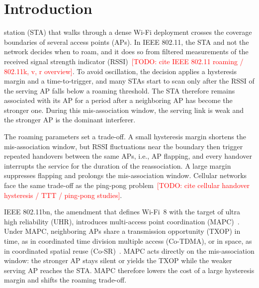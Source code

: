 \documentclass{ieeeaccess}
\newcommand{\todo}[1]{\textcolor{red}{[TODO: #1]}}
\begin{document}
\maketitle

\section{Introduction}
\label{sec:introduction}
 station (STA) that walks through a dense Wi-Fi deployment crosses the coverage boundaries of several access points (APs). In IEEE 802.11, the STA and not the network decides when to roam, and it does so from filtered measurements of the received signal strength indicator (RSSI)~\todo{cite IEEE 802.11 roaming / 802.11k, v, r overview}. To avoid oscillation, the decision applies a hysteresis margin and a time-to-trigger, and many STAs start to scan only after the RSSI of the serving AP falls below a roaming threshold. The STA therefore remains associated with its AP for a period after a neighboring AP has become the stronger one. During this mis-association window, the serving link is weak and the stronger AP is the dominant interferer.

The roaming parameters set a trade-off. A small hysteresis margin shortens the mis-association window, but RSSI fluctuations near the boundary then trigger repeated handovers between the same APs, i.e., AP flapping, and every handover interrupts the service for the duration of the reassociation. A large margin suppresses flapping and prolongs the mis-association window. Cellular networks face the same trade-off as the ping-pong problem~\todo{cite cellular handover hysteresis / TTT / ping-pong studies}.

IEEE 802.11bn, the amendment that defines Wi-Fi~8 with the target of ultra high reliability (UHR), introduces multi-access point coordination (MAPC)~\cite{galati2024wifi8}. Under MAPC, neighboring APs share a transmission opportunity (TXOP) in time, as in coordinated time division multiple access (Co-TDMA), or in space, as in coordinated spatial reuse (Co-SR)~\cite{lopez2019ieee}. MAPC acts directly on the mis-association window: the stronger AP stays silent or yields the TXOP while the weaker serving AP reaches the STA. MAPC therefore lowers the cost of a large hysteresis margin and shifts the roaming trade-off.
\end{document}
